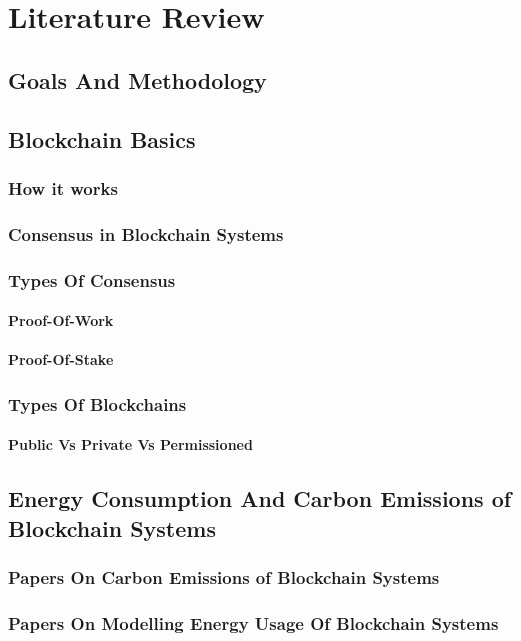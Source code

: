 \chapter{Literature Review}
\section{Goals And Methodology}
\section{Blockchain Basics}
\subsection{How it works}
\subsection{Consensus in Blockchain Systems}
\subsection{Types Of Consensus}
\subsubsection{Proof-Of-Work}
\subsubsection{Proof-Of-Stake}
\subsection{Types Of Blockchains}
\subsubsection{Public Vs Private Vs Permissioned}
\section{Energy Consumption And Carbon Emissions of Blockchain Systems}
\subsection{Papers On Carbon Emissions of Blockchain Systems}
\subsection{Papers On Modelling Energy Usage Of Blockchain Systems}
